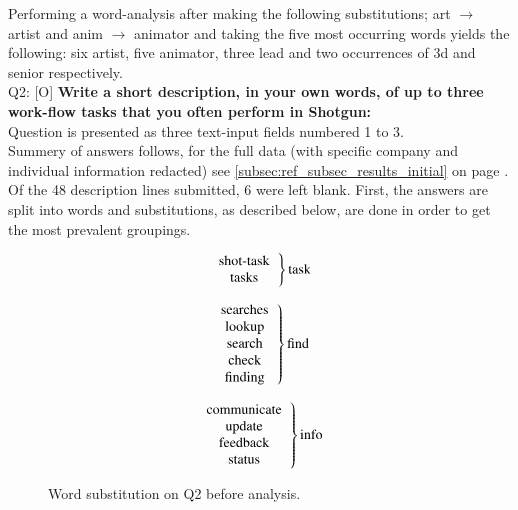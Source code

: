   Performing a word-analysis after making the following substitutions; art
  $\rightarrow$ artist and anim $\rightarrow$ animator and taking the five most
  occurring words yields the following: six artist, five animator, three lead and two
  occurrences of 3d and senior respectively. \\

  Q2: [O] \textbf{%
    Write a short description, in your own words, of up to three
    work-flow tasks that you often perform in Shotgun:
  } \\
  Question is presented as three text-input fields numbered 1 to 3.\\

  Summery of answers follows, for the full data (with specific company and
  individual information redacted) see \ref{subsec:ref_subsec_results_initial}
  on page \pageref{subsec:ref_subsec_results_initial}. Of the 48
  description lines submitted, 6 were left blank. First, the answers are split
  into words and substitutions, as described below, are done in order to get the
  most prevalent groupings. \vspace{-0.4cm}
  \begin{figure}[H]
    \begin{minipage}[c]{0.3\textwidth}
    \begin{equation*} \left. \begin{tabular}{c}
      \text{shot-task} \\
      \text{tasks} \\
    \end{tabular}\right \} \text{task} \end{equation*}
    \end{minipage}
    \begin{minipage}[c]{0.3\textwidth}
    \begin{equation*} \left. \begin{tabular}{c}
      \text{searches} \\
      \text{lookup} \\
      \text{search} \\
      \text{check} \\
      \text{finding} \\
    \end{tabular}\right \} \text{find} \end{equation*}
    \end{minipage}
    \begin{minipage}[c]{0.3\textwidth}
    \begin{equation*} \left. \begin{tabular}{c}
      \text{communicate} \\
      \text{update} \\
      \text{feedback} \\
      \text{status} \\
    \end{tabular}\right \} \text{info} \end{equation*}
    \end{minipage}
    \caption{Word substitution on Q2 before analysis.}
  \end{figure}

